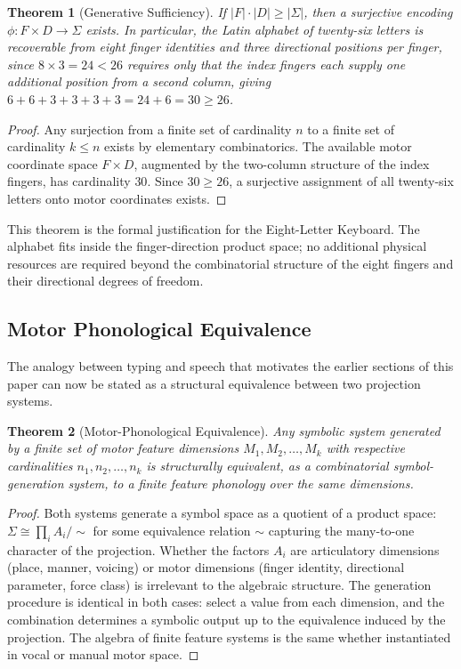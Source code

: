\documentclass[12pt,a4paper]{article}
\theoremstyle{plain}
\newtheorem{theorem}{Theorem}
\theoremstyle{definition}
\theoremstyle{remark}
\begin{document}
\begin{theorem}[Generative Sufficiency]
If $|F| \cdot |D| \geq |\Sigma|$, then a surjective encoding
$\phi : F \times D \to \Sigma$ exists. In particular, the Latin alphabet
of twenty-six letters is recoverable from eight finger identities and three
directional positions per finger, since $8 \times 3 = 24 < 26$ requires only
that the index fingers each supply one additional position from a second column,
giving $6 + 6 + 3 + 3 + 3 + 3 = 24 + 6 = 30 \geq 26$.
\end{theorem}

\begin{proof}
Any surjection from a finite set of cardinality $n$ to a finite set of
cardinality $k \leq n$ exists by elementary combinatorics. The available
motor coordinate space $F \times D$, augmented by the two-column structure
of the index fingers, has cardinality $30$. Since $30 \geq 26$, a surjective
assignment of all twenty-six letters onto motor coordinates exists.
\end{proof}

This theorem is the formal justification for the Eight-Letter Keyboard. The
alphabet fits inside the finger-direction product space; no additional physical
resources are required beyond the combinatorial structure of the eight fingers
and their directional degrees of freedom.

\subsection{Motor Phonological Equivalence}

The analogy between typing and speech that motivates the earlier sections of
this paper can now be stated as a structural equivalence between two projection
systems.

\begin{theorem}[Motor-Phonological Equivalence]
Any symbolic system generated by a finite set of motor feature dimensions
$M_1, M_2, \ldots, M_k$ with respective cardinalities $n_1, n_2, \ldots, n_k$
is structurally equivalent, as a combinatorial symbol-generation system, to
a finite feature phonology over the same dimensions.
\end{theorem}

\begin{proof}
Both systems generate a symbol space as a quotient of a product space:
$\Sigma \cong \prod_i A_i / {\sim}$ for some equivalence relation $\sim$
capturing the many-to-one character of the projection. Whether the factors
$A_i$ are articulatory dimensions (place, manner, voicing) or motor dimensions
(finger identity, directional parameter, force class) is irrelevant to the
algebraic structure. The generation procedure is identical in both cases:
select a value from each dimension, and the combination determines a symbolic
output up to the equivalence induced by the projection. The algebra of finite
feature systems is the same whether instantiated in vocal or manual motor space.
\end{proof}
\end{document}
